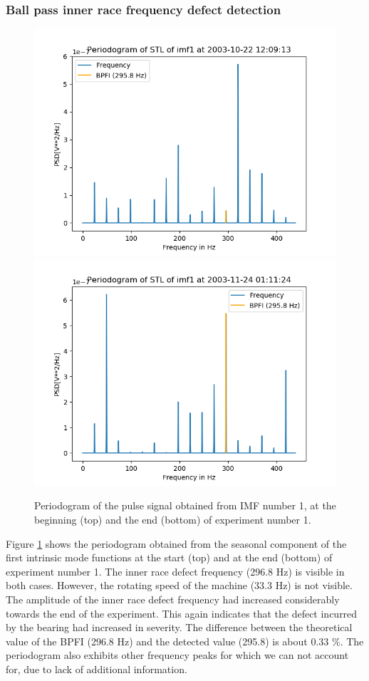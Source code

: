 \documentclass[../Main/thesis.tex]{subfiles}
\begin{document}
\subsubsection{ Ball pass inner race frequency defect detection }

\begin{figure}[H]
	\centering
	\includegraphics[width=0.8\linewidth]{../fig/periodogram_bpfi/start_imf1_bpfi}
	\includegraphics[width=0.8\linewidth]{../fig/periodogram_bpfi/end_imf1_bpfi}
	\caption{Periodogram of the pulse signal obtained from IMF number 1, at the beginning (top) and the end (bottom) of experiment number 1.}
	\label{fig:startimf1bpfi}
\end{figure}
\justify
Figure \ref{fig:startimf1bpfi} shows the periodogram obtained from the seasonal component of the first intrinsic mode functions at the start (top) and at the end (bottom) of experiment number 1. The inner race defect frequency (296.8 Hz) is visible in both cases.
However, the rotating speed of the machine (33.3 Hz) is not visible. The amplitude of the inner race defect frequency had increased considerably towards the end of the experiment. This again indicates that the defect incurred by the bearing had increased in severity.
The difference between the theoretical value of the BPFI (296.8 Hz) and the detected value (295.8) is about 0.33 $\%$. The periodogram also exhibits other frequency peaks for which we can not account for, due to lack of additional information.
\justify
\end{document}
